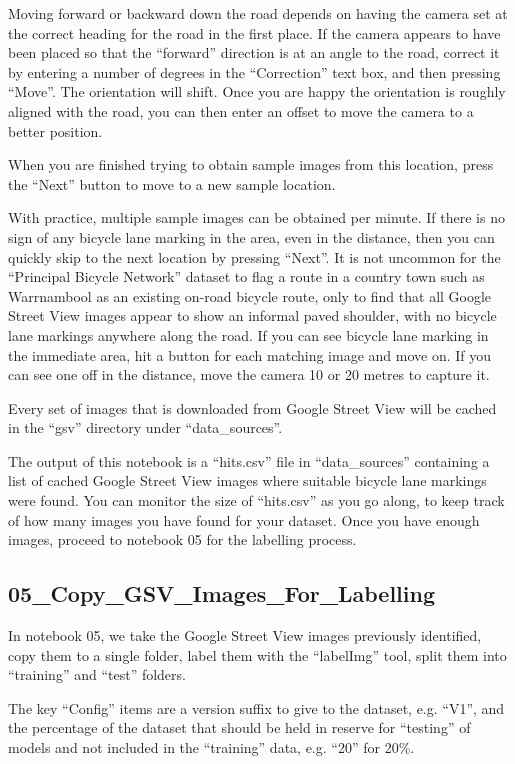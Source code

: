 \documentclass[11pt,twoside]{report}
\begin{document}
Moving forward or backward down the road depends on having the camera set at the correct heading for the road in the first place.  If the camera appears to have been placed so that the ``forward'' direction is at an angle to the road, correct it by entering  a number of degrees in the ``Correction'' text box, and then pressing ``Move''.  The orientation will shift.  Once you are happy the orientation is roughly aligned with the road, you can then enter an offset to move the camera to a better position.

When you are finished trying to obtain sample images from this location, press the ``Next'' button to move to a new sample location.

With practice, multiple sample images can be obtained per minute.  If there is no sign of any bicycle lane marking in the area, even in the distance, then you can quickly skip to the next location by pressing ``Next''.  It is not uncommon for the ``Principal Bicycle Network'' dataset to flag a route in a country town such as Warrnambool as an existing on-road bicycle route, only to find that all Google Street View images appear to show an informal paved shoulder, with no bicycle lane markings anywhere along the road.  If you can see bicycle lane marking in the immediate area, hit a button for each matching image and move on.  If you can see one off in the distance, move the camera 10 or 20 metres to capture it.

Every set of images that is downloaded from Google Street View will be cached in the ``gsv'' directory under ``data\_sources''.

The output of this notebook is a ``hits.csv'' file in ``data\_sources'' containing a list of cached Google Street View images where suitable bicycle lane markings were found.  You can monitor the size of ``hits.csv'' as you go along, to keep track of how many images you have found for your dataset.  Once you have enough images, proceed to notebook 05 for the labelling process.

\subsection{05\_Copy\_GSV\_Images\_For\_Labelling}
\label{aj05}

In notebook 05, we take the Google Street View images previously identified, copy them to a single folder, label them with the ``labelImg'' tool, split them into ``training'' and ``test'' folders.

The key ``Config'' items are a version suffix to give to the dataset, e.g. ``V1'', and the percentage of the dataset that should be held in reserve for ``testing'' of models and not included in the ``training'' data, e.g. ``20'' for 20\%.
\end{document}
